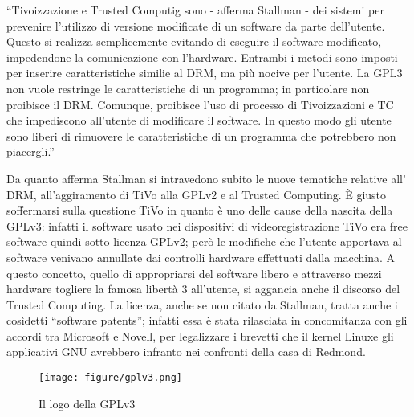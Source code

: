 
``Tivoizzazione e Trusted Computig sono - afferma Stallman - dei sistemi per prevenire l'utilizzo di versione modificate di un software da parte dell'utente. Questo si realizza semplicemente evitando di eseguire il software modificato, impedendone la comunicazione con l'hardware. Entrambi i metodi sono imposti per inserire caratteristiche similie al DRM, ma più nocive per l'utente. La GPL3 non vuole restringe le caratteristiche di un programma; in particolare non proibisce il DRM. Comunque, proibisce l'uso di processo di Tivoizzazioni e TC che impediscono all'utente di modificare il software. In questo modo gli utente sono liberi di rimuovere le caratteristiche di un programma che potrebbero non piacergli.''

Da quanto afferma Stallman si intravedono subito le nuove tematiche relative all' DRM, all'aggiramento di TiVo alla GPLv2 e al Trusted Computing. \`E giusto soffermarsi sulla questione TiVo in quanto è uno delle cause della nascita della GPLv3: infatti il software usato nei dispositivi di videoregistrazione TiVo era free software quindi sotto licenza GPLv2; però le modifiche che l'utente apportava al software venivano annullate dai controlli hardware effettuati dalla macchina. A questo concetto, quello di appropriarsi del software libero e attraverso mezzi hardware togliere la famosa libertà 3 all'utente, si aggancia anche il discorso del Trusted Computing. La licenza, anche se non citato da Stallman, tratta anche i cosìdetti ``software patents''; infatti essa è stata rilasciata in concomitanza con gli accordi tra Microsoft e Novell, per legalizzare i brevetti che il kernel Linuxe gli applicativi GNU avrebbero infranto nei confronti della casa di Redmond.

\begin{figure}[b]
	\begin{center}
		\texttt{[image: figure/gplv3.png]}
	\end{center}
	\caption{Il logo della GPLv3}
\end{figure}

